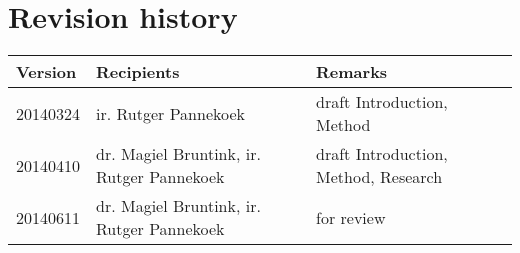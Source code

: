 \chapter*{Revision history}

\begin{tabular}{p{2cm} p{7cm} p{5cm}}
	\hline
	\bfseries{Version}\rm & \bfseries{Recipients}\rm & \bfseries{Remarks}\rm \\
	\hline
	20140324 & ir. Rutger Pannekoek & draft Introduction, Method \\
	20140410 & dr. Magiel Bruntink, ir. Rutger Pannekoek & draft Introduction,
	Method, Research
	\\
	20140611 & dr. Magiel Bruntink, ir. Rutger Pannekoek & for review \\
	\hline
\end{tabular}
